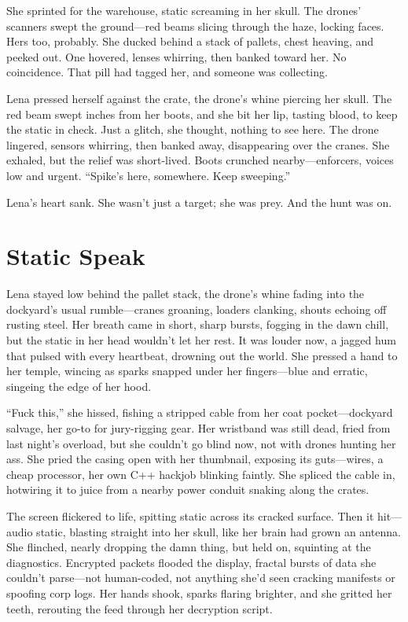 \documentclass[12pt]{book}
\begin{document}
She sprinted for the warehouse, static screaming in her skull. The drones' scanners swept the ground---red beams slicing through the haze, locking faces. Hers too, probably. She ducked behind a stack of pallets, chest heaving, and peeked out. One hovered, lenses whirring, then banked toward her. No coincidence. That pill had tagged her, and someone was collecting.

Lena pressed herself against the crate, the drone's whine piercing her skull. The red beam swept inches from her boots, and she bit her lip, tasting blood, to keep the static in check. Just a glitch, she thought, nothing to see here. The drone lingered, sensors whirring, then banked away, disappearing over the cranes. She exhaled, but the relief was short-lived. Boots crunched nearby---enforcers, voices low and urgent. ``Spike's here, somewhere. Keep sweeping.''

Lena's heart sank. She wasn't just a target; she was prey. And the hunt was on.

\section{Static Speak}

Lena stayed low behind the pallet stack, the drone’s whine fading into the dockyard’s usual rumble---cranes groaning, loaders clanking, shouts echoing off rusting steel. Her breath came in short, sharp bursts, fogging in the dawn chill, but the static in her head wouldn’t let her rest. It was louder now, a jagged hum that pulsed with every heartbeat, drowning out the world. She pressed a hand to her temple, wincing as sparks snapped under her fingers---blue and erratic, singeing the edge of her hood.

``Fuck this,'' she hissed, fishing a stripped cable from her coat pocket---dockyard salvage, her go-to for jury-rigging gear. Her wristband was still dead, fried from last night’s overload, but she couldn’t go blind now, not with drones hunting her ass. She pried the casing open with her thumbnail, exposing its guts---wires, a cheap processor, her own C++ hackjob blinking faintly. She spliced the cable in, hotwiring it to juice from a nearby power conduit snaking along the crates.

The screen flickered to life, spitting static across its cracked surface. Then it hit---audio static, blasting straight into her skull, like her brain had grown an antenna. She flinched, nearly dropping the damn thing, but held on, squinting at the diagnostics. Encrypted packets flooded the display, fractal bursts of data she couldn’t parse---not human-coded, not anything she’d seen cracking manifests or spoofing corp logs. Her hands shook, sparks flaring brighter, and she gritted her teeth, rerouting the feed through her decryption script.
\end{document}
